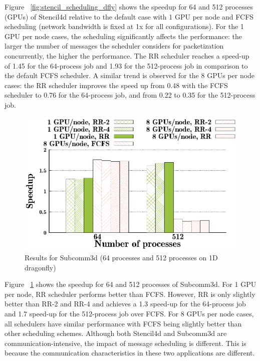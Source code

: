 Figure ~\ref{fig:stencil_scheduling_dfly} shows the speedup for 64 and 512
processes (GPUs) of Stencil4d relative to the default case with 1 GPU per node and
FCFS scheduling (network bandwidth is fixed at 1x for all configurations).  For
the 1 GPU per node cases, the scheduling significantly affects the performance:
the larger the number of messages the scheduler considers for packetization
concurrently, the higher the performance. The RR scheduler reaches a speed-up of
1.45 for the 64-process job and 1.93 for the 512-process job in comparison to
the default FCFS scheduler. A similar trend is observed for the 8 GPUs per node
cases: the RR scheduler improves the speed up from 0.48 with the FCFS scheduler to 0.76
for the 64-process job, and from 0.22 to 0.35 for the 512-process job. 

\begin{figure}[t]
\centering
  \includegraphics[width=0.8\columnwidth]{figure/plots/sched/dfly-sched-mapping-subcom.eps}
  \vspace{-0.5in}
  \caption{Results for Subcomm3d (64 processes and 512 processes on 1D dragonfly)}
  \label{fig:subcomm3d_scheduling_dfly}
\end{figure}


Figure ~\ref{fig:subcomm3d_scheduling_dfly} shows the speedup for 64 and 512
processes of Subcomm3d.  For 1 GPU per node, RR scheduler performs better
than FCFS. However, RR is only slightly better than RR-2 and RR-4 and achieves a
1.3 speed-up for the 64-process job and 1.7 speed-up for the 512-process job
over FCFS.  For 8 GPUs per node cases, all schedulers have similar performance
with FCFS being slightly better than other scheduling schemes. Although both
Stencil4d and Subcomm3d are communication-intensive, the impact of message
scheduling is different. This is because the communication characteristics in
these two applications are different. 

